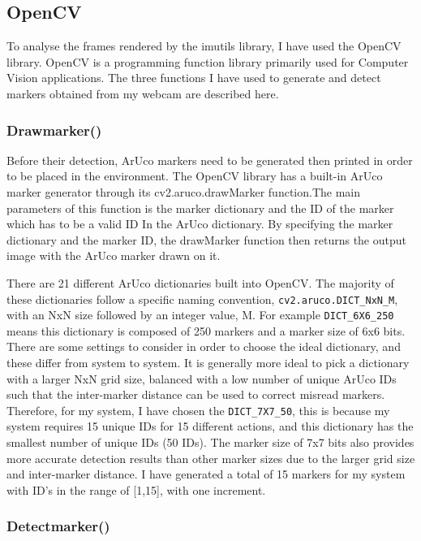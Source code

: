 \documentclass[oneside,%
                    author={Malak Hajji},
                    degree={BSc},
                    title={Designing An Accessible Computational Toolkit For Students},
                  subtitle={With Mixed Visual Abilities}]{dissertation}
\begin{document}
\subsection{OpenCV}

To analyse the frames rendered by the imutils library, I have used the OpenCV library. OpenCV is a programming function library primarily used for Computer Vision applications. The three functions I have used to generate and detect markers obtained from my webcam are described here. 

\subsubsection{Drawmarker()}

Before their detection, ArUco markers need to be generated then printed in order to be placed in the environment. The OpenCV library has a built-in ArUco marker generator through its 
cv2.aruco.drawMarker function.The main parameters of this function is the marker dictionary  and the ID of the marker which has to be a valid ID In the ArUco dictionary. By specifying the marker dictionary and the marker ID, the drawMarker function then returns the output image with the ArUco marker drawn on it. 

There are 21 different ArUco dictionaries built into OpenCV. The majority of these dictionaries follow a specific naming convention, \texttt{cv2.aruco.DICT\_NxN\_M}, with an NxN size followed by an integer value, M. For example \texttt{DICT\_6X6\_250} means this dictionary is composed of 250 markers and a marker size of 6x6 bits. There are some settings to consider in order to choose the ideal dictionary, and these differ from system to system. It is generally more ideal to pick a dictionary with a larger NxN grid size, balanced with a low number of unique ArUco IDs such that the inter-marker distance can be used to correct misread markers. 
Therefore, for my system, I have chosen the \texttt{DICT\_7X7\_50}, this is because my system requires 15 unique IDs for 15 different actions, and this dictionary has the smallest number of unique IDs (50 IDs). The marker size of 7x7 bits also provides more accurate detection results than other marker sizes due to the larger grid size and inter-marker distance. 
I have generated a total of 15 markers for my system with ID’s in the range of [1,15], with one increment. 

\subsubsection{Detectmarker()}
\end{document}
